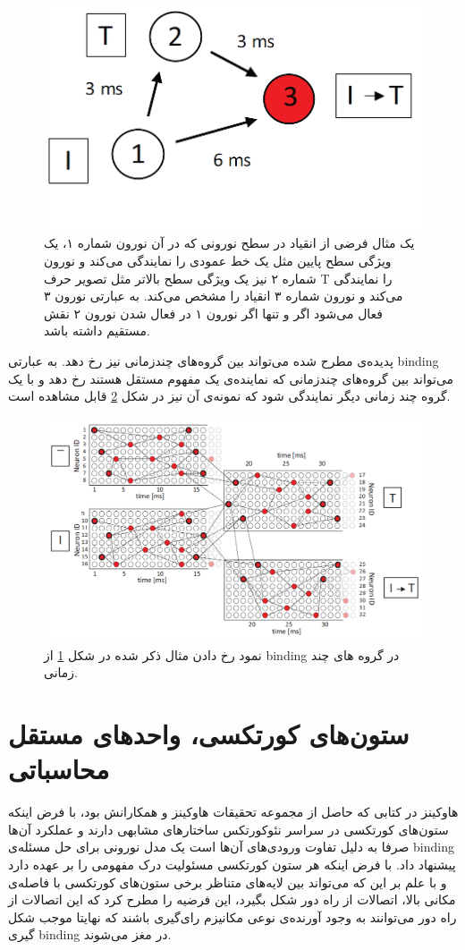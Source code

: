 \documentclass[12pt]{report}
\begin{document}
	\begin{figure}[H]
		\centering
		\includegraphics[width=0.7\linewidth]{poly-bind.png}
		\caption[NS]{
			یک مثال فرضی از انقیاد در سطح نورونی که در آن نورون شماره ۱، یک ویژگی سطح پایین مثل یک خط عمودی را نمایندگی می‌کند و نورون شماره ۲ نیز یک ویژگی سطح بالاتر مثل تصویر حرف T را نمایندگی می‌کند و نورون شماره ۳ انقیاد را مشخص می‌کند. به عبارتی نورون ۳ فعال می‌شود اگر و تنها اگر نورون ۱ در فعال شدن نورون ۲ نقش مستقیم داشته باشد.
		}
		\label{fig:eguchi-binding}
	\end{figure}
	
	پدیده‌ی مطرح شده می‌تواند بین گروه‌های چندزمانی نیز رخ دهد. به عبارتی \gls{binding} می‌تواند بین گروه‌های چندزمانی که نماینده‌ی یک مفهوم مستقل هستند رخ دهد و با یک گروه چند زمانی دیگر نمایندگی شود که نمونه‌ی آن نیز در شکل \ref{fig:eguchi-binding-group} قابل مشاهده است.
	
	\begin{figure}[H]
		\centering
		\includegraphics[width=0.7\linewidth]{poly-group-bind.png}
		\caption[NS]{
			نمود رخ دادن مثال ذکر شده در شکل \ref{fig:eguchi-binding}  از \gls{binding} در گروه های چند زمانی.
		}
		\label{fig:eguchi-binding-group}
	\end{figure}
	
	\section{ستون‌های کورتکسی، واحد‌های مستقل محاسباتی}
	هاوکینز در کتابی \cite{Hawkins2021-rq} که حاصل از مجموعه تحقیقات هاوکینز و همکارانش
	\cite{Hawkins2016, Hawkins2017, Lewis2019}
	بود، با فرض اینکه ستون‌های کورتکسی در سراسر نئوکورتکس ساختار‌های مشابهی دارند و عملکرد آن‌ها صرفا به دلیل تفاوت ورودی‌های آن‌ها است \cite{Mountcastle1978} یک مدل نورونی برای حل مسئله‌ی \gls{binding} پیشنهاد داد. با فرض اینکه هر ستون کورتکسی مسئولیت درک مفهومی را بر عهده دارد و با علم بر این که می‌تواند بین لایه‌های متناظر برخی ستون‌های کورتکسی با فاصله‌ی مکانی بالا، اتصالات از راه دور شکل بگیرد، این فرضیه را مطرح کرد که این اتصالات از راه دور می‌توانند به وجود آورنده‌ی نوعی مکانیزم رای‌گیری باشند که نهایتا موجب شکل گیری \gls{binding} در مغز می‌شوند.
	
\end{document}
